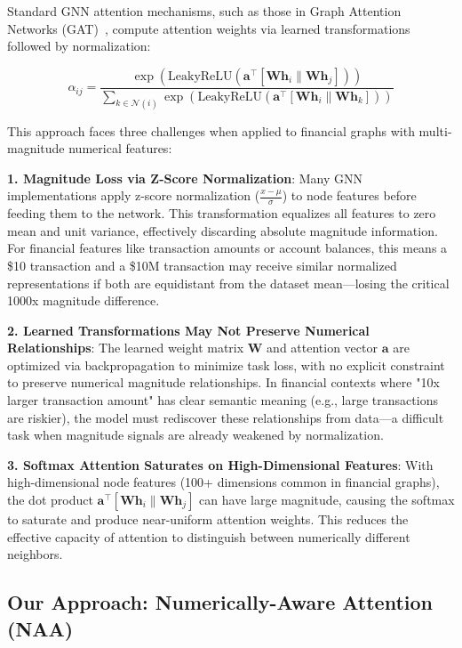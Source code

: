 Standard GNN attention mechanisms, such as those in Graph Attention Networks (GAT)~\cite{velivckovic2018gat}, compute attention weights via learned transformations followed by normalization:

\begin{equation}
\alpha_{ij} = \frac{\exp(\text{LeakyReLU}(\mathbf{a}^\top [\mathbf{W}\mathbf{h}_i \| \mathbf{W}\mathbf{h}_j]))}{\sum_{k \in \mathcal{N}(i)} \exp(\text{LeakyReLU}(\mathbf{a}^\top [\mathbf{W}\mathbf{h}_i \| \mathbf{W}\mathbf{h}_k]))}
\end{equation}

This approach faces three challenges when applied to financial graphs with multi-magnitude numerical features:

\textbf{1. Magnitude Loss via Z-Score Normalization}: Many GNN implementations apply z-score normalization ($\frac{x - \mu}{\sigma}$) to node features before feeding them to the network. This transformation equalizes all features to zero mean and unit variance, effectively discarding absolute magnitude information. For financial features like transaction amounts or account balances, this means a \$10 transaction and a \$10M transaction may receive similar normalized representations if both are equidistant from the dataset mean---losing the critical 1000x magnitude difference.

\textbf{2. Learned Transformations May Not Preserve Numerical Relationships}: The learned weight matrix $\mathbf{W}$ and attention vector $\mathbf{a}$ are optimized via backpropagation to minimize task loss, with no explicit constraint to preserve numerical magnitude relationships. In financial contexts where "10x larger transaction amount" has clear semantic meaning (e.g., large transactions are riskier), the model must rediscover these relationships from data---a difficult task when magnitude signals are already weakened by normalization.

\textbf{3. Softmax Attention Saturates on High-Dimensional Features}: With high-dimensional node features (100+ dimensions common in financial graphs), the dot product $\mathbf{a}^\top [\mathbf{W}\mathbf{h}_i \| \mathbf{W}\mathbf{h}_j]$ can have large magnitude, causing the softmax to saturate and produce near-uniform attention weights. This reduces the effective capacity of attention to distinguish between numerically different neighbors.

\subsection{Our Approach: Numerically-Aware Attention (NAA)}

